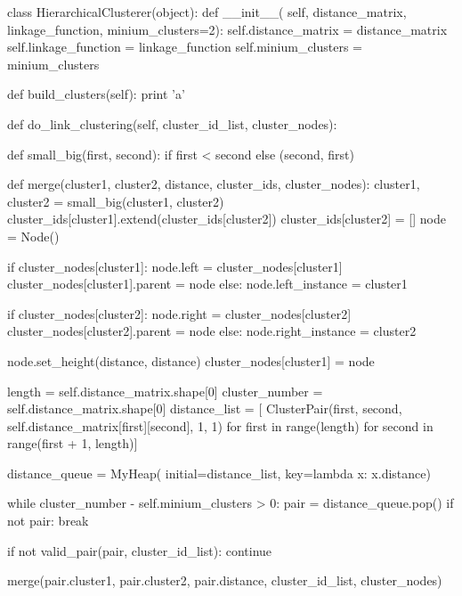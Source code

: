 \documentclass[10pt]{article}
\begin{document}
\begin{python}
class HierarchicalClusterer(object):
    def __init__(
            self,
            distance_matrix,
            linkage_function,
            minium_clusters=2):
        self.distance_matrix = distance_matrix
        self.linkage_function = linkage_function
        self.minium_clusters = minium_clusters

    def build_clusters(self):
        print 'a'

    def do_link_clustering(self, cluster_id_list, cluster_nodes):

        def small_big(first, second):
             if first < second else (second, first)

        def merge(cluster1,
                  cluster2,
                  distance,
                  cluster_ids,
                  cluster_nodes):
            cluster1, cluster2 = small_big(cluster1, cluster2)
            cluster_ids[cluster1].extend(cluster_ids[cluster2])
            cluster_ids[cluster2] = []
            node = Node()

            if cluster_nodes[cluster1]:
                node.left = cluster_nodes[cluster1]
                cluster_nodes[cluster1].parent = node
            else:
                node.left_instance = cluster1

            if cluster_nodes[cluster2]:
                node.right = cluster_nodes[cluster2]
                cluster_nodes[cluster2].parent = node
            else:
                node.right_instance = cluster2

            node.set_height(distance, distance)
            cluster_nodes[cluster1] = node

        length = self.distance_matrix.shape[0]
        cluster_number = self.distance_matrix.shape[0]
        distance_list = [
            ClusterPair(first,
            second,
            self.distance_matrix[first][second], 1, 1)
            for first in range(length) for second in range(first + 1, 
            length)]

        distance_queue = MyHeap(
            initial=distance_list,
            key=lambda x: x.distance)

        while cluster_number - self.minium_clusters > 0:
            pair = distance_queue.pop()
            if not pair:
                break

            if not valid_pair(pair, cluster_id_list):
                continue

            merge(pair.cluster1, pair.cluster2,
             pair.distance, cluster_id_list, cluster_nodes)


\end{python}
\end{document}

